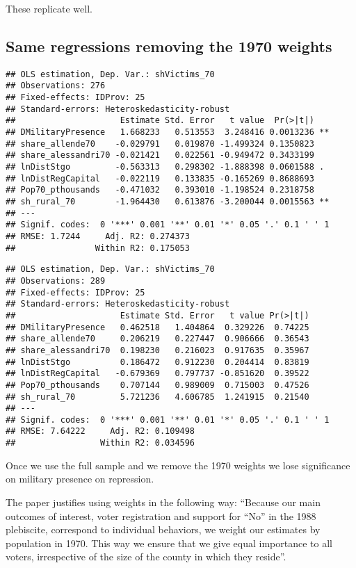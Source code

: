 \documentclass[
]{article}
\begin{document}
These replicate well.

\hypertarget{same-regressions-removing-the-1970-weights}{%
\subsection{Same regressions removing the 1970
weights}\label{same-regressions-removing-the-1970-weights}}

\begin{verbatim}
## OLS estimation, Dep. Var.: shVictims_70
## Observations: 276 
## Fixed-effects: IDProv: 25
## Standard-errors: Heteroskedasticity-robust 
##                     Estimate Std. Error   t value  Pr(>|t|)    
## DMilitaryPresence   1.668233   0.513553  3.248416 0.0013236 ** 
## share_allende70    -0.029791   0.019870 -1.499324 0.1350823    
## share_alessandri70 -0.021421   0.022561 -0.949472 0.3433199    
## lnDistStgo         -0.563313   0.298302 -1.888398 0.0601588 .  
## lnDistRegCapital   -0.022119   0.133835 -0.165269 0.8688693    
## Pop70_pthousands   -0.471032   0.393010 -1.198524 0.2318758    
## sh_rural_70        -1.964430   0.613876 -3.200044 0.0015563 ** 
## ---
## Signif. codes:  0 '***' 0.001 '**' 0.01 '*' 0.05 '.' 0.1 ' ' 1
## RMSE: 1.7244     Adj. R2: 0.274373
##                Within R2: 0.175053
\end{verbatim}

\begin{verbatim}
## OLS estimation, Dep. Var.: shVictims_70
## Observations: 289 
## Fixed-effects: IDProv: 25
## Standard-errors: Heteroskedasticity-robust 
##                     Estimate Std. Error   t value Pr(>|t|) 
## DMilitaryPresence   0.462518   1.404864  0.329226  0.74225 
## share_allende70     0.206219   0.227447  0.906666  0.36543 
## share_alessandri70  0.198230   0.216023  0.917635  0.35967 
## lnDistStgo          0.186472   0.912230  0.204414  0.83819 
## lnDistRegCapital   -0.679369   0.797737 -0.851620  0.39522 
## Pop70_pthousands    0.707144   0.989009  0.715003  0.47526 
## sh_rural_70         5.721236   4.606785  1.241915  0.21540 
## ---
## Signif. codes:  0 '***' 0.001 '**' 0.01 '*' 0.05 '.' 0.1 ' ' 1
## RMSE: 7.64222     Adj. R2: 0.109498
##                 Within R2: 0.034596
\end{verbatim}

Once we use the full sample and we remove the 1970 weights we lose
significance on military presence on repression.

The paper justifies using weights in the following way: ``Because our
main outcomes of interest, voter registration and support for ``No'' in
the 1988 plebiscite, correspond to individual behaviors, we weight our
estimates by population in 1970. This way we ensure that we give equal
importance to all voters, irrespective of the size of the county in
which they reside''.
\end{document}

